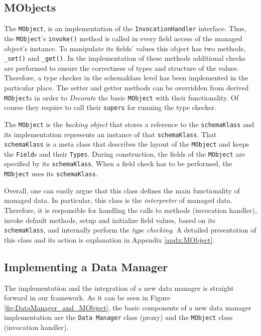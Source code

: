 \subsection{MObjects}\label{sec:Managed Objects}
The \texttt{MObject}, is an implementation of the \texttt{InvocationHandler} interface.
Thus, the \texttt{MObject}'s \texttt{invoke()} method is called in every field access of the managed object's instance.
To manipulate its fields' values this object has two methods, \texttt{\_set()} and \texttt{\_get()}.
In the implementation of these methods additional checks are performed to ensure the correctness of types and structure of the values.
Therefore, a type checker in the schemaklass level has been implemented in the particular place.
The setter and getter methods can be overridden from derived \texttt{MObject}s in order to \textit{Decorate} the basic \texttt{MObject} with their functionality. 
Of course they require to call their \texttt{supers} for running the type checker.

The \texttt{MObject} is the \textit{backing object} that stores a reference to the \texttt{schemaKlass} and its implementation represents an instance of that \texttt{schemaKlass}.
That \texttt{schemaKlass} is a meta class that describes the layout of the \texttt{MObject} and keeps the \texttt{Field}s and their \texttt{Types}.
During construction, the fields of the \texttt{MObject} are specified by its \texttt{schemaKlass}.
When a field check has to be performed, the \texttt{MObject} uses its \texttt{schemaKlass}.

Overall, one can easily argue that this class defines the main functionality of managed data.
In particular, this class is the \textit{interpreter} of managed data.
Therefore, it is responsible for handling the calls to methods (invocation handler), invoke default methods, setup and initialize field values, based on its \texttt{schemaKlass}, and internally perform the \textit{type checking}.
A detailed presentation of this class and its action is explanation in Appendix \ref{apdx:MObject}.

\subsection{Implementing a Data Manager}\label{Implementing a Data Manager}
The implementation and the integration of a new data manager is straight forward in our framework.
As it can be seen in Figure \ref{fig:DataManager_and_MObject}, the basic components of a new data manager implementation are the \texttt{Data Manager} class (proxy) and the \texttt{MObject} class (invocation handler).

